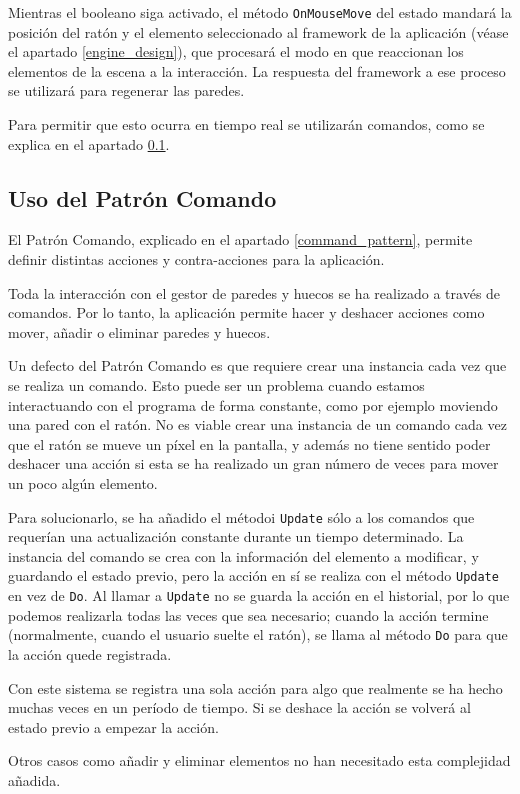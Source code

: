 Mientras el booleano siga activado, el método \texttt{OnMouseMove} del estado mandará la posición del ratón y el elemento seleccionado al framework de la aplicación (véase el apartado \ref{engine_design}), que procesará el modo en que reaccionan los elementos de la escena a la interacción. La respuesta del framework a ese proceso se utilizará para regenerar las paredes.

Para permitir que esto ocurra en tiempo real se utilizarán comandos, como se explica en el apartado \ref{use_of_command}.

\subsection{Uso del Patrón Comando}
\label{use_of_command}
El Patrón Comando, explicado en el apartado \ref{command_pattern}, permite definir distintas acciones y contra-acciones para la aplicación.

Toda la interacción con el gestor de paredes y huecos se ha realizado a través de comandos. Por lo tanto, la aplicación permite hacer y deshacer acciones como mover, añadir o eliminar paredes y huecos.

Un defecto del Patrón Comando es que requiere crear una instancia cada vez que se realiza un comando. Esto puede ser un problema cuando estamos interactuando con el programa de forma constante, como por ejemplo moviendo una pared con el ratón. No es viable crear una instancia de un comando cada vez que el ratón se mueve un píxel en la pantalla, y además no tiene sentido poder deshacer una acción si esta se ha realizado un gran número de veces para mover un poco algún elemento.

Para solucionarlo, se ha añadido el métodoi \texttt{Update} sólo a los comandos que requerían una actualización constante durante un tiempo determinado. La instancia del comando se crea con la información del elemento a modificar, y guardando el estado previo, pero la acción en sí se realiza con el método \texttt{Update} en vez de \texttt{Do}. Al llamar a \texttt{Update} no se guarda la acción en el historial, por lo que podemos realizarla todas las veces que sea necesario; cuando la acción termine (normalmente, cuando el usuario suelte el ratón), se llama al método \texttt{Do} para que la acción quede registrada.

Con este sistema se registra una sola acción para algo que realmente se ha hecho muchas veces en un período de tiempo. Si se deshace la acción se volverá al estado previo a empezar la acción.

Otros casos como añadir y eliminar elementos no han necesitado esta complejidad añadida.